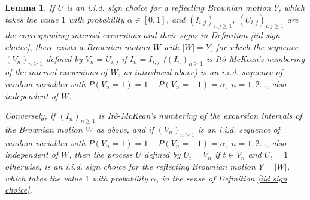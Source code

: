 \documentclass[reqno]{amsart}
\newtheorem{lemma}[theorem]{Lemma}
\theoremstyle{definition}
\theoremstyle{remark}
\numberwithin{equation}{section}
\begin{document}
\begin{lemma}\label{equivalence of excursion numberings}
If $U$ is an i.i.d. sign choice for a reflecting Brownian motion $Y$, which takes the value $1$ with probability $\alpha\in[0,1]$, and $(I_{i,j})_{i,j\ge 1}$, $(U_{i,j})_{i,j\ge 1}$ are the corresponding interval excursions and their signs in Definition \ref{iid sign choice}, there exists a Brownian motion $W$ with $\vert W\vert =Y$, for which the sequence $(V_n)_{n\ge 1}$ defined by $V_n=U_{i,j}$ if $I_n=I_{i,j}$ ($(I_n)_{n\ge 1}$ is It\^{o}-McKean's numbering of the interval excursions of $W$, as introduced above) is an i.i.d. sequence of random variables with $P(V_n=1)=1-P(V_n=-1)=\alpha$, $n=1,2\ldots$, also independent of $W$.

Conversely, if $(I_n)_{n\ge 1}$ is It\^{o}-McKean's numbering of the excursion intervals of the Brownian motion $W$ as above, and if $(V_n)_{n\ge 1}$ is an i.i.d. sequence of random variables with $P(V_n=1)=1-P(V_n=-1)=\alpha$, $n=1,2\ldots$, also independent of $W$, then the process $U$ defined by $U_t=V_n$ if $t\in V_n$ and $U_t=1$ otherwise, is an i.i.d. sign choice for the reflecting Brownian motion $Y=\vert W\vert$, which takes the value $1$ with probability $\alpha$, in the sense of Definition \ref{iid sign choice}.
\end{lemma}
\end{document}

